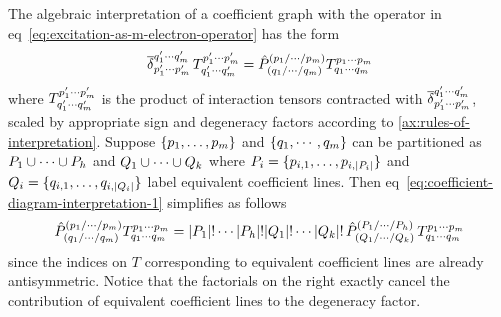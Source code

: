 \documentclass[11pt]{article}
\numberwithin{equation}{section}
\begin{document}
\begin{rmk}\label{rmk:algebraic-interpretation-of-coefficient-graph}
The algebraic interpretation of a coefficient graph with the operator in eq~\ref{eq:excitation-as-m-electron-operator} has the form
\begin{align}\label{eq:coefficient-diagram-interpretation-1}
  \overline{\delta }_{p_1'\cdots p_m'}^{q_1'\cdots q_m'}\,
  T^{p_1'\cdots p_m'}_{q_1'\cdots q_m'}
=
  \hat{P}^{(p_1/\cdots /p_m)}_{(q_1/\cdots /q_m)}
  T^{p_1\cdots p_m}_{q_1\cdots q_m}
\end{align}
where $T^{p_1'\cdots p_m'}_{q_1'\cdots q_m'}$ is the product of interaction tensors contracted with $\overline{\delta }_{p_1'\cdots p_m'}^{q_1'\cdots q_m'}$, scaled by appropriate sign and degeneracy factors according to \cref{ax:rules-of-interpretation}.
Suppose $\{p_1,\ldots,p_m\}$ and $\{q_1,\cdots,q_m\}$ can be partitioned as $P_1\cup\cdots\cup P_h$ and $Q_1\cup\cdots\cup Q_k$ where $P_i=\{p_{i,1},\ldots,p_{i,|P_i|}\}$ and $Q_i=\{q_{i,1},\ldots,q_{i,|Q_i|}\}$ label equivalent coefficient lines.
Then eq~\ref{eq:coefficient-diagram-interpretation-1} simplifies as follows
\begin{align}
  \hat{P}^{(p_1/\cdots /p_m)}_{(q_1/\cdots /q_m)}
  T^{p_1\cdots p_m}_{q_1\cdots q_m}
=
  |P_1|!\cdots|P_h|!|Q_1|!\cdots|Q_k|!\,
  \hat{P}^{(P_1/\cdots /P_h)}_{(Q_1/\cdots /Q_k)}\,
  T^{p_1\cdots p_m}_{q_1\cdots q_m}
\end{align}
since the indices on $T$ corresponding to equivalent coefficient lines are already antisymmetric.
Notice that the factorials on the right exactly cancel the contribution of equivalent coefficient lines to the degeneracy factor.
\end{rmk}
\end{document}
